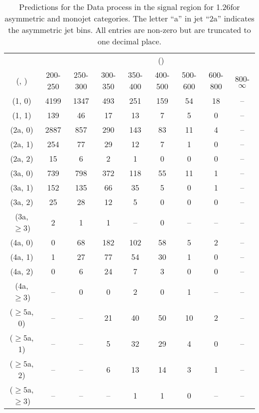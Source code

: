 \begin{table}[h!]
\tiny
\centering
\caption{Predictions for the Data process in the signal region for 1.26\ifb for asymmetric and monojet categories. The letter ``a'' in jet \eg ``2a''  indicates the asymmetric jet bins. All entries are non-zero but are truncated to one decimal place.\label{tab:predsep_sig_data_asym}}
\begin{tabular}
{ccccccccc}
	\hline\hline
&	& \multicolumn{8}{c}{\scalht (\gev)} \\ 
	 (\njet,  \nb) & 200-250 & 250-300 & 300-350 & 350-400 & 400-500 & 500-600 & 600-800 & 800-$\infty$ \\ [0.8ex] 
\hline
	(1, 0) & 4199 & 1347 & 493 & 251 & 159 & 54 & 18 & -- \\[0.5ex] 
	(1, 1) & 139 & 46 & 17 & 13 & 7 & 5 & 0 & -- \\[0.5ex] 
	(2a, 0) & 2887 & 857 & 290 & 143 & 83 & 11 & 4 & -- \\[0.5ex] 
	(2a, 1) & 254 & 77 & 29 & 12 & 7 & 1 & 0 & -- \\[0.5ex] 
	(2a, 2) & 15 & 6 & 2 & 1 & 0 & 0 & 0 & -- \\[0.5ex] 
	(3a, 0) & 739 & 798 & 372 & 118 & 55 & 11 & 1 & -- \\[0.5ex] 
	(3a, 1) & 152 & 135 & 66 & 35 & 5 & 0 & 1 & -- \\[0.5ex] 
	(3a, 2) & 25 & 28 & 12 & 5 & 0 & 0 & 0 & -- \\[0.5ex] 
	(3a, $\ge3$) & 2 & 1 & 1 & -- & 0 & -- & -- & -- \\[0.5ex] 
	(4a, 0) & 0 & 68 & 182 & 102 & 58 & 5 & 2 & -- \\[0.5ex] 
	(4a, 1) & 1 & 27 & 77 & 54 & 30 & 1 & 0 & -- \\[0.5ex] 
	(4a, 2) & 0 & 6 & 24 & 7 & 3 & 0 & 0 & -- \\[0.5ex] 
	(4a, $\ge3$) & -- & 0 & 0 & 2 & 0 & 1 & -- & -- \\[0.5ex] 
	($\ge5$a, 0) & -- & -- & 21 & 40 & 50 & 10 & 2 & -- \\[0.5ex] 
	($\ge5$a, 1) & -- & -- & 5 & 32 & 29 & 4 & 0 & -- \\[0.5ex] 
	($\ge5$a, 2) & -- & -- & 6 & 13 & 14 & 3 & 1 & -- \\[0.5ex] 
	($\ge5$a, $\ge3$) & -- & -- & -- & 1 & 1 & 0 & -- & -- \\[0.5ex] 
	\hline
	\hline
\end{tabular}
\end{table}
